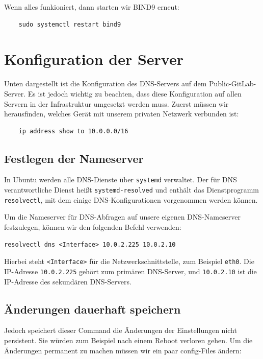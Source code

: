 \documentclass[a4paper,12pt]{article}
\begin{document}
Wenn alles funkioniert, dann starten wir BIND9 erneut:
\begin{verbatim}
	sudo systemctl restart bind9
\end{verbatim}



\section{Konfiguration der Server}

Unten dargestellt ist die Konfiguration des DNS-Servers auf dem Public-GitLab-Server. 
Es ist jedoch wichtig zu beachten, dass diese Konfiguration auf allen Servern in der Infrastruktur umgesetzt werden muss. 
Zuerst müssen wir herausfinden, welches Gerät mit unserem privaten Netzwerk verbunden ist:

\begin{verbatim}
	ip address show to 10.0.0.0/16
\end{verbatim}


\subsection{Festlegen der Nameserver}  
In Ubuntu werden alle DNS-Dienste über \texttt{systemd} verwaltet. Der für DNS verantwortliche Dienst heißt \texttt{systemd-resolved} und enthält das Dienstprogramm \texttt{resolvectl}, mit dem einige DNS-Konfigurationen vorgenommen werden können.  

Um die Nameserver für DNS-Abfragen auf unsere eigenen DNS-Nameserver festzulegen, können wir den folgenden Befehl verwenden:  

\begin{verbatim}
resolvectl dns <Interface> 10.0.2.225 10.0.2.10
\end{verbatim}  

Hierbei steht \texttt{<Interface>} für die Netzwerkschnittstelle, zum Beispiel \texttt{eth0}.  
Die IP-Adresse \texttt{10.0.2.225} gehört zum primären DNS-Server, und \texttt{10.0.2.10} ist die IP-Adresse des sekundären DNS-Servers. 






\subsection{Änderungen dauerhaft speichern}
Jedoch speichert dieser Command die Änderungen der Einstellungen nicht persistent. Sie würden zum Beispiel nach einem Reboot verloren gehen. 
Um die Änderungen permanent zu machen müssen wir ein paar config-Files ändern: \newline
\end{document}
